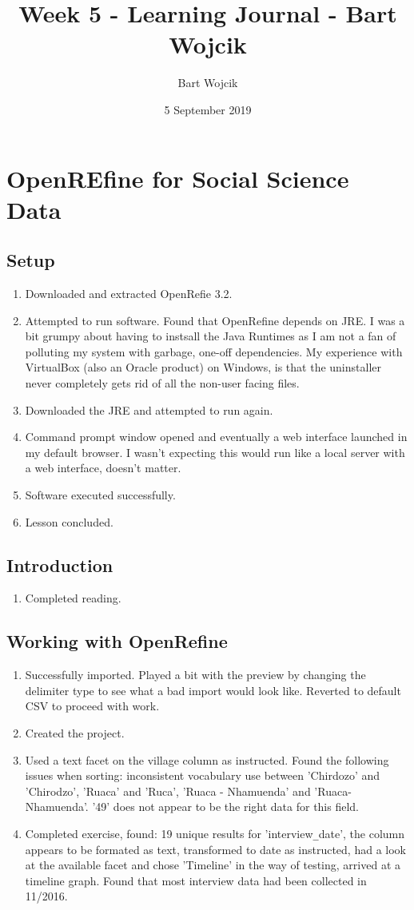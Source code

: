\documentclass{article}
\title{Week 5 - Learning Journal   - Bart Wojcik}
\author{Bart Wojcik}
\date{5 September 2019}
\begin{document}
\maketitle

\section{OpenREfine for Social Science Data}
\subsection{Setup}
\begin{enumerate}
    \item Downloaded and extracted OpenRefie 3.2.
    \item Attempted to run software. Found that OpenRefine depends on JRE. I was a bit grumpy about having to instsall the Java Runtimes as I am not a fan of polluting my system with garbage, one-off dependencies. My experience with VirtualBox (also an Oracle product) on Windows, is that the uninstaller never completely gets rid of all the non-user facing files.
    \item Downloaded the JRE and attempted to run again.
    \item Command prompt window opened and eventually a web interface launched in my default browser. I wasn't expecting this would run like a local server with a web interface, doesn't matter.
    \item Software executed successfully.
    \item Lesson concluded.
\end{enumerate}
\subsection{Introduction}
\begin{enumerate}
    \item Completed reading.
\end{enumerate}
\subsection{Working with OpenRefine}
\begin{enumerate}
    \item Successfully imported. Played a bit with the preview by changing the delimiter type to see what a bad import would look like. Reverted to default CSV to proceed with work.
    \item Created the project.
    \item Used a text facet on the village column as instructed. Found the following issues when sorting: inconsistent vocabulary use between 'Chirdozo' and 'Chirodzo', 'Ruaca' and 'Ruca', 'Ruaca - Nhamuenda' and 'Ruaca-Nhamuenda'. '49' does not appear to be the right data for this field.
    \item Completed exercise, found: 19 unique results for 'interview\verb|_|date', the column appears to be formated as text, transformed to date as instructed, had a look at the available facet and chose 'Timeline' in the way of testing, arrived at a timeline graph. Found that most interview data had been collected in 11/2016.
\end{enumerate}
\end{document}
